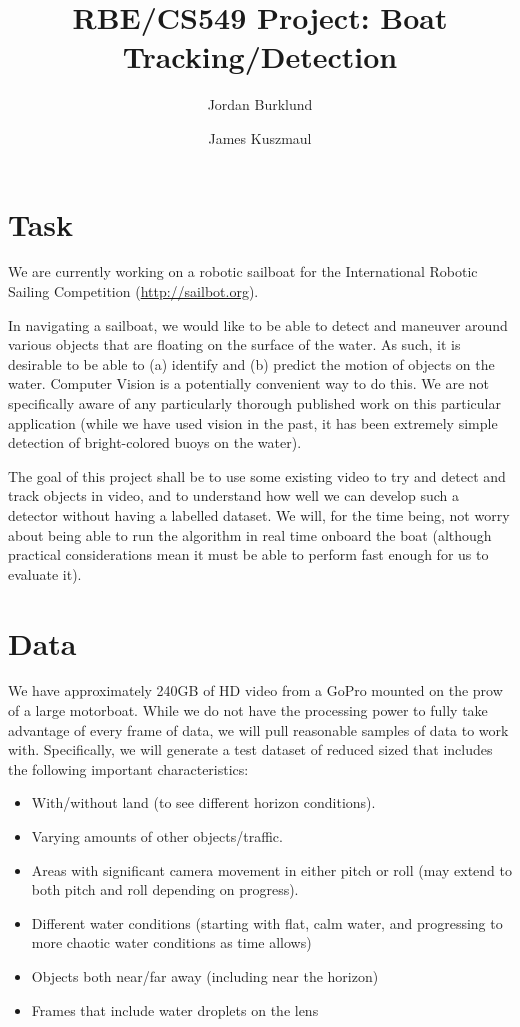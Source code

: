 \documentclass{article}
\title{RBE/CS549 Project: Boat Tracking/Detection}
\author{Jordan Burklund \and James Kuszmaul}
\begin{document}
\maketitle

\section{Task}

We are currently working on a robotic sailboat for the
International Robotic Sailing Competition (\url{http://sailbot.org}).

In navigating a sailboat, we would like to be able to
detect and maneuver around various objects
that are floating on the surface of the water. As such,
it is desirable to be able to (a) identify and (b)
predict the motion of objects on the water. Computer
Vision is a potentially convenient way to do this.
We are not specifically aware of any particularly
thorough published work on this particular application
(while we have used vision in the past, it has been
extremely simple detection of bright-colored buoys
on the water).

The goal of this project shall be to use some existing
video to try and detect and track objects in video,
and to understand how well we can develop such a
detector without having a labelled dataset. We will,
for the time being, not worry about being able to run
the algorithm in real time onboard the boat (although
practical considerations mean it must be able to
perform fast enough for us to evaluate it).

\section{Data}

We have approximately 240GB of HD video from a GoPro
mounted on the prow of a large motorboat. While we
do not have the processing power to fully take advantage
of every frame of data, we will pull reasonable samples
of data to work with.  Specifically, we will generate a test dataset of reduced sized that includes the following important characteristics:

\begin{itemize}
\item With/without land (to see different horizon conditions).
\item Varying amounts of other objects/traffic.
\item Areas with significant camera movement in either pitch or roll (may extend to both pitch and roll depending on progress).
\item Different water conditions (starting with flat, calm water, and progressing to more chaotic water conditions as time allows)
\item Objects both near/far away (including near the horizon)
\item Frames that include water droplets on the lens
\end{itemize}
\end{document}
